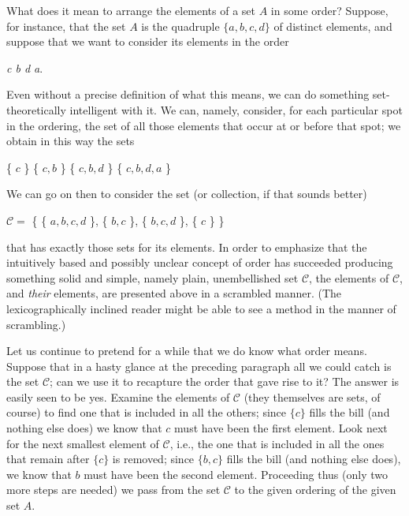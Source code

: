 

What does it mean to arrange the elements of a set $A$ in some order? Suppose, for instance, that the set $A$ is the quadruple $ \{a, b, c, d \} $ of distinct elements, and suppose that we want to consider its elements in the order 

\begin{center}
\textit{c b d a}.
\end{center}

Even without a precise definition of what this means, we can do something set-theoretically intelligent with it. We can, namely, consider, for each particular spot in the ordering, the set of all those elements that occur at or before that spot; we obtain in this way the sets 

\begin{center}
 \{ $c$ \}  \{ $c, b$ \} \{ $c, b, d$ \} \{ $c, b, d, a$ \} 
\end{center}

We can go on then to consider the set (or collection, if that sounds better) 

\begin{center}
$\mathcal{C} = $ \{ \{ $a, b, c, d$ \}, \{ $b, c$ \}, \{ $b, c, d$ \}, \{ $c$ \} \} 
\end{center}

that has exactly those sets for its elements. In order to emphasize that the intuitively based and possibly unclear concept of order has succeeded producing something solid and simple, namely plain,  unembellished set $ \mathcal{C} $, the elements of $ \mathcal{C} $, and \textit{their} elements, are presented above in a scrambled manner. (The lexicographically inclined reader might be able to see a method in the manner of scrambling.) 

Let us continue to pretend for a while that we do know what order means. Suppose that in a hasty glance at the preceding paragraph all we could catch is the set $\mathcal{C}$; can we use it to recapture the order that gave rise to it? The answer is easily seen to be yes. Examine the elements of $ \mathcal{C} $ (they themselves are sets, of course) to find one that is included in all the others; since $ \{c \}$ fills the bill (and nothing else does) we know that $c$ must have been the first element. Look next for the next smallest element of $ \mathcal{C}$, i.e., the one that is included in all the ones that remain after $ \{ c \} $ is removed; since $ \{ b, c \} $ fills the bill (and nothing else does), we know that $b$ must have been the second element. Proceeding thus (only two more steps are needed) we pass from the set $ \mathcal{C} $ to the given ordering of the given set $A$. 

